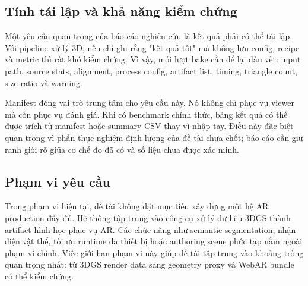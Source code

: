 \subsection{Tính tái lập và khả năng kiểm chứng}

Một yêu cầu quan trọng của báo cáo nghiên cứu là kết quả phải có thể tái lập. Với pipeline xử lý 3D, nếu chỉ ghi rằng "kết quả tốt" mà không lưu config, recipe và metric thì rất khó kiểm chứng. Vì vậy, mỗi lượt bake cần để lại dấu vết: input path, source stats, alignment, process config, artifact list, timing, triangle count, size ratio và warning.

Manifest đóng vai trò trung tâm cho yêu cầu này. Nó không chỉ phục vụ viewer mà còn phục vụ đánh giá. Khi có benchmark chính thức, bảng kết quả có thể được trích từ manifest hoặc summary CSV thay vì nhập tay. Điều này đặc biệt quan trọng vì phần thực nghiệm định lượng của đề tài chưa chốt; báo cáo cần giữ ranh giới rõ giữa cơ chế đo đã có và số liệu chưa được xác minh.

\subsection{Phạm vi yêu cầu}

Trong phạm vi hiện tại, đề tài không đặt mục tiêu xây dựng một hệ AR production đầy đủ. Hệ thống tập trung vào công cụ xử lý dữ liệu 3DGS thành artifact hình học phục vụ AR. Các chức năng như semantic segmentation, nhận diện vật thể, tối ưu runtime đa thiết bị hoặc authoring scene phức tạp nằm ngoài phạm vi chính. Việc giới hạn phạm vi này giúp đề tài tập trung vào khoảng trống quan trọng nhất: từ 3DGS render data sang geometry proxy và WebAR bundle có thể kiểm chứng.
